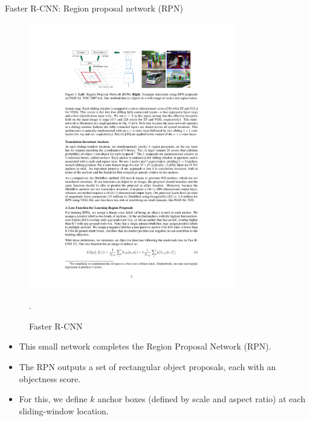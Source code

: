 \documentclass[xcolor=pdftex,dvipsnames,table]{beamer}
\begin{document}
\begin{frame}{Faster R-CNN: Region proposal network (RPN)}
\begin{figure}[htb]
   \centering
   \includegraphics[width=0.8\textwidth]{../graphics/Faster_R-CNN.pdf}
   \caption{Faster R-CNN \cite{Ren2017}}.
\end{figure}
\begin{itemize}
\item This small network completes the Region Proposal Network (RPN).
\item The RPN outputs a set of rectangular object proposals, each with an objectness score.
\item For this, we define $k$ anchor boxes (defined by scale and aspect ratio) at each sliding-window location.
\end{itemize}
\end{frame}
\end{document}
